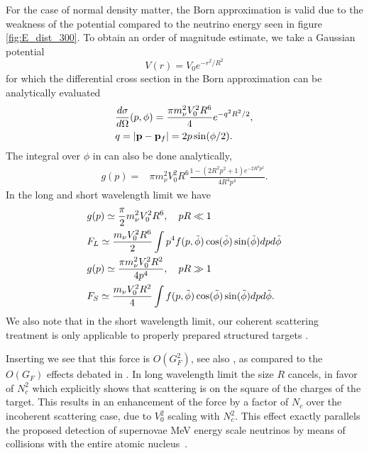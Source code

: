 For the case of normal density matter, the Born approximation is valid due to the weakness of the potential compared to the neutrino energy seen in figure \ref{fig:E_dist_300}. To obtain an order of magnitude estimate, we take a Gaussian potential \begin{equation}
V(r)=V_0e^{-r^2/R^2}
\end{equation}
for which the differential cross section in the Born approximation can be analytically evaluated
\begin{align}
&\frac{d\sigma}{ d\Omega}(p,\phi)=\frac{\pi m_\nu^2V_0^2R^6}{4}e^{-q^2R^2/2},\notag\\
&q=|{\bf p}-{\bf p}_f|=2p\sin(\phi/2).
\end{align}
The integral over $\phi$ in  can also be done analytically,
\begin{align}
g(p)=&\pi m_\nu^2V_0^2R^6\frac{1-(2R^2p^2+1)e^{-2R^2p^2}}{4R^4p^4}.
\end{align}
 In the long and short wavelength limit we have 
\begin{align}
\label{long_wave_drag}
&g(p)\simeq\frac{\pi}{2} m_\nu^2V_0^2R^6,\quad pR\ll 1\\
&F_L\simeq \frac{m_\nu V_0^2R^6}{2} \int p^4 f(p,\tilde\phi) \cos(\tilde\phi) \sin(\tilde\phi) dpd\tilde\phi\notag\\
\label{short_wave_drag}
&g(p)\simeq\frac{\pi m_\nu^2V_0^2R^2}{4p^4}, 
\quad pR\gg 1\\
&F_S\simeq \frac{ m_\nu V_0^2R^2}{4} \int f(p,\tilde\phi) \cos(\tilde\phi) \sin(\tilde\phi) dpd\tilde\phi\notag.
\end{align}
 We also note that in the short wavelength limit, our coherent scattering treatment is only applicable to properly prepared structured targets \cite{Liao:2012}.

Inserting  we see that this force is $O(G_F^2)$, see also \cite{Shvartsman,Smith,Gelmini}, as compared to the $O(G_F)$ effects debated in  \cite{Opher,Lewis,Opher2,Cabibbo:1982,Langacker:1982,Smith,Ferreras:1995wf}. In long wavelength limit the size $R$ cancels, in favor of $N_c^2$ which explicitly shows that scattering is on the square of the charges of the target. This results in an enhancement of the force by a factor of $N_c$ over the incoherent scattering case, due to $V_0^2$ scaling with $N_c^2$. This effect exactly parallels the proposed detection of supernovae MeV energy scale neutrinos by means of collisions with the entire atomic nucleus~\cite{Divari:2012zz}.  




